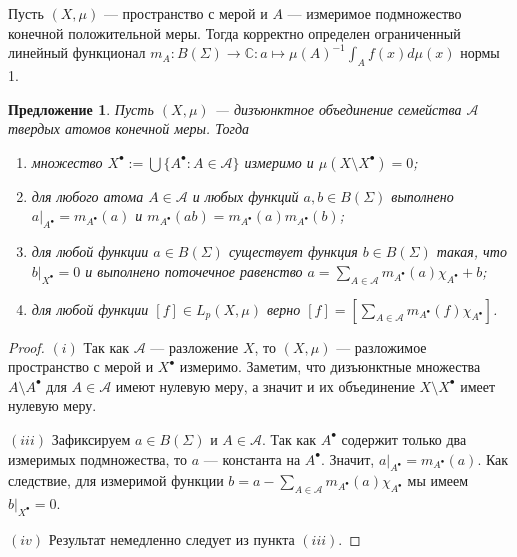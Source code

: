 \documentclass[12pt]{article}
\newtheorem{proposition}[theorem]{Предложение}
\begin{document}
Пусть $(X,\mu)$ --- пространство с мерой и $A$ --- измеримое подмножество
конечной положительной меры. Тогда корректно определен ограниченный линейный
функционал $m_A:B(\Sigma)\to\mathbb{C}:a\mapsto {\mu(A)}^{-1}\int_A f(x)d\mu(x)$
нормы 1.

\begin{proposition}\label{HardAtomicMeasProp} Пусть $(X,\mu)$ --- дизъюнктное
    объединение семейства $\mathcal{A}$ твердых атомов конечной меры. Тогда
    \begin{enumerate}[label = (\roman*)]
        \item множество $X^\bullet:=\bigcup \{A^\bullet:A\in\mathcal{A}\}$
              измеримо и $\mu(X\setminus X^\bullet)=0$;

        \item для любого атома $A\in\mathcal{A}$ и любых функций $a,b\in
                  B(\Sigma)$ выполнено $a|_{A^\bullet}=m_{A^\bullet}(a)$ и
              $m_{A^\bullet}(ab)=m_{A^\bullet}(a)m_{A^\bullet}(b)$;

        \item для любой функции $a\in B(\Sigma)$ существует функция $b\in
                  B(\Sigma)$ такая, что $b|_{X^\bullet}=0$ и выполнено
              поточечное равенство $a=\sum_{A\in\mathcal{A}}
                  m_{A^\bullet}(a)\chi_{A^\bullet} + b$;

        \item для любой функции $[f]\in L_p(X,\mu)$ верно
              $[f]=[\sum_{A\in\mathcal{A}} m_{A^\bullet}(f)\chi_{A^\bullet}]$.
    \end{enumerate}
\end{proposition}
\begin{proof} $(i)$ Так как $\mathcal{A}$ --- разложение $X$, то $(X,\mu)$ ---
    разложимое пространство с мерой и $X^\bullet$ измеримо. Заметим, что
    дизъюнктные множества $A\setminus A^\bullet$ для $A\in\mathcal{A}$ имеют
    нулевую меру, а значит и их объединение $X\setminus X^\bullet$ имеет нулевую
    меру.

    $(iii)$ Зафиксируем $a\in B(\Sigma)$ и $A\in \mathcal{A}$. Так как
    $A^\bullet$ содержит только два измеримых подмножества, то $a$ --- константа
    на $A^\bullet$. Значит, $a|_{A^\bullet}=m_{A^\bullet}(a)$. Как следствие,
    для измеримой функции
    $b=a-\sum_{A\in\mathcal{A}}m_{A^\bullet}(a)\chi_{A^\bullet}$ мы имеем
    $b|_{X^\bullet}=0$.

    $(iv)$ Результат немедленно следует из пункта $(iii)$.
\end{proof}
\end{document}
